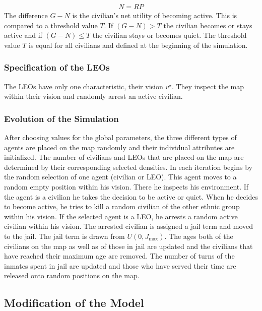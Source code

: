 \documentclass[11pt]{article}
\begin{document}
\begin{align}
N = RP
\end{align}
The difference $G - N$ is the civilian's net utility of becoming active. This is compared to a threshold value $T$. If $(G - N) > T$ the civilian becomes or stays active and if $(G - N) \leq T$ the civilian stays or becomes quiet. The threshold value $T$ is equal for all civilians and defined at the beginning of the simulation.

\subsubsection{Specification of the LEOs}
The LEOs have only one characteristic, their vision $v^\star$. They inspect the map within their vision and randomly arrest an active civilian.

\subsubsection{Evolution of the Simulation}
After choosing values for the global parameters, the three different types of agents are placed on the map randomly and their individual attributes are initialized. The number of civilians and LEOs that are placed on the map are determined by their corresponding selected densities. In each iteration begins by the random selection of one agent (civilian or LEO). This agent moves to a random empty position within his vision. There he inspects his environment. If the agent is a civilian he takes the decision to be active or quiet. When he decides to become active, he tries to kill a random civilian of the other ethnic group within his vision. If the selected agent is a LEO, he arrests a random active civilian within his vision. The arrested civilian is assigned a jail term and moved to the jail. The jail term is drawn from $U(0,J_{\text{max}})$. The ages both of the civilians on the map as well as of those in jail are updated and the civilians that have reached their maximum age are removed. The number of turns of the inmates spent in jail are updated and those who have served their time are released onto random positions on the map.

\subsection{Modification of the Model}
\end{document}
